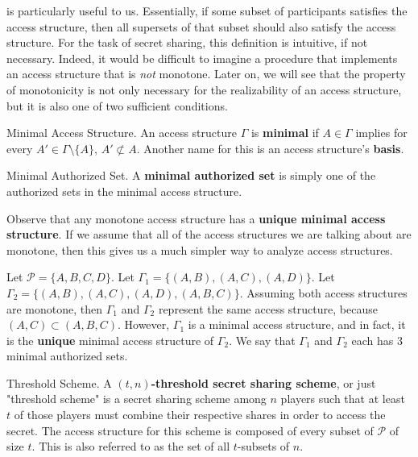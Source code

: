  is particularly useful to us. Essentially, if some subset of participants satisfies the access structure, then all supersets of that subset should also satisfy the access structure. For the task of secret sharing, this definition is intuitive, if not necessary. Indeed, it would be difficult to imagine a procedure that implements an access structure that is \textit{not} monotone. Later on, we will see that the property of monotonicity is not only necessary for the realizability of an access structure, but it is also one of two sufficient conditions.

\begin{definition}{Minimal Access Structure.}
    \label{defn:minimal-as}
    An access structure $\Gamma$ is \textbf{minimal} if $A \in \Gamma$ implies for every $A' \in \Gamma \setminus \{A\}$, $A' \not\subset A$. Another name for this is an access structure's \textbf{basis}.
\end{definition}

\begin{definition}{Minimal Authorized Set.}
    \label{defn:minimal-authorized-set}
    A \textbf{minimal authorized set} is simply one of the authorized sets in the minimal access structure.
\end{definition}

Observe that any monotone access structure has a \textbf{unique minimal access structure}. If we assume that all of the access structures we are talking about are monotone, then this gives us a much simpler way to analyze access structures.

\begin{example}
    Let $\mathcal{P} = \{A,B,C,D\}$. Let $\Gamma_1 = \{(A,B), (A,C), (A,D)\}$. Let $\Gamma_2 = \{(A,B), (A,C), (A,D), (A,B,C)\}$. Assuming both access structures are monotone, then $\Gamma_1$ and $\Gamma_2$ represent the same access structure, because $(A,C) \subset (A,B,C)$. However, $\Gamma_1$ is a minimal access structure, and in fact, it is the \textbf{unique} minimal access structure of $\Gamma_2$. We say that $\Gamma_1$ and $\Gamma_2$ each has 3 minimal authorized sets.
\end{example}

\begin{definition}{Threshold Scheme.}
    \label{defn:threshold-scheme}
    A \textbf{$(t,n)$-threshold secret sharing scheme}, or just "threshold scheme" is a secret sharing scheme among $n$ players such that at least $t$ of those players must combine their respective shares in order to access the secret. The access structure for this scheme is composed of every subset of $\mathcal{P}$ of size $t$. This is also referred to as the set of all $t$-subsets of $n$.
\end{definition}

